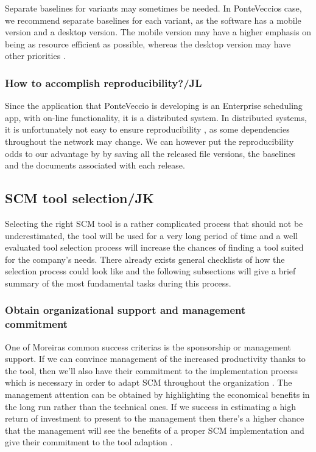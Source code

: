 \documentclass[10pt]{article}
\begin{document}
\noindent Separate baselines for variants may sometimes be needed. In PonteVeccios case, we recommend separate baselines for each variant, as the software has a mobile version and a desktop version. The mobile version may have a higher emphasis on being as resource efficient as possible, whereas the desktop version may have other priorities \cite{Nielsen}.

\subsubsection{How to accomplish reproducibility?/JL}
\noindent Since the application that PonteVeccio is developing is an Enterprise scheduling app, with on-line functionality, it is a distributed system. In distributed systems, it is unfortunately not easy to ensure reproducibility \cite{Bays}, as some dependencies throughout the network may change. We can however put the reproducibility odds to our advantage by by saving all the released file versions, the baselines and the documents associated with each release. 

\subsection{SCM tool selection/JK}
Selecting the right SCM tool is a rather complicated process that should not be underestimated, the tool will be used for a very long period of time and a well evaluated tool selection process will increase the chances of finding a tool suited for the company's needs. There already exists general checklists of how the selection process could look like and the following subsections will give a brief summary of the most fundamental tasks during this process.

\subsubsection{Obtain organizational support and management commitment}
One of Moreiras \cite{Moreira} common success criterias is the sponsorship or management support. If we can convince management of the increased productivity thanks to the tool, then we'll also have their commitment to the implementation process which is necessary in order to adapt SCM throughout the organization \cite{Sayko}. The management attention can be obtained by highlighting the economical benefits in the long run rather than the technical ones. If we success in estimating a high return of investment to present to the management then there's a higher chance that the management will see the benefits of a proper SCM implementation and give their commitment to the tool adaption \cite{Sayko}. 
\end{document}
